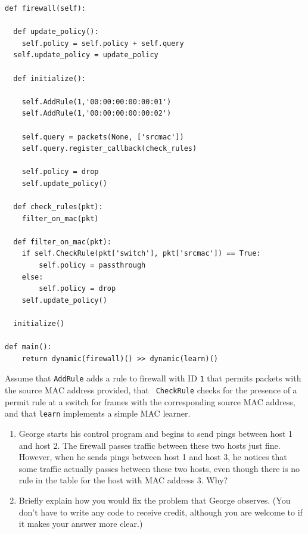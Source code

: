 \documentclass[11pt]{article}
\newcommand{\ansbelow}{\probnote{Answer legibly in the space below.}}
\begin{document}
\begin{scriptsize}
\begin{lstlisting}
def firewall(self):

  def update_policy():
    self.policy = self.policy + self.query
  self.update_policy = update_policy

  def initialize():

    self.AddRule(1,'00:00:00:00:00:01')
    self.AddRule(1,'00:00:00:00:00:02')
    
    self.query = packets(None, ['srcmac'])
    self.query.register_callback(check_rules)

    self.policy = drop
    self.update_policy()

  def check_rules(pkt):
    filter_on_mac(pkt)

  def filter_on_mac(pkt):
    if self.CheckRule(pkt['switch'], pkt['srcmac']) == True:
        self.policy = passthrough
    else:
        self.policy = drop
    self.update_policy()

  initialize()

def main():
    return dynamic(firewall)() >> dynamic(learn)()
\end{lstlisting}
\end{scriptsize}
Assume that {\tt AddRule} adds a rule to firewall with ID {\tt 1} that
permits packets with the source MAC address provided, that {\tt
  CheckRule} checks for the presence of a permit rule at a switch for
frames with the corresponding source MAC address, and that {\tt learn}
implements a simple MAC learner.

\begin{enumerate}
\item George starts his control program and begins to send pings between
  host 1 and host 2.  The firewall passes traffic between these two
  hosts just fine.  However, when he sends pings between host 1 and host
  3, he notices that some traffic actually passes between these two
  hosts, even though there is no rule in the table for the host with MAC
  address 3.  Why?  
\item Briefly explain how you would fix the problem that George
  observes.  (You don't have to write any code to receive credit, although you are welcome to
  if it makes your answer more clear.)
\end{enumerate}

 
~\ansbelow{}
\vspace{2in}
\eprob
\end{document}
